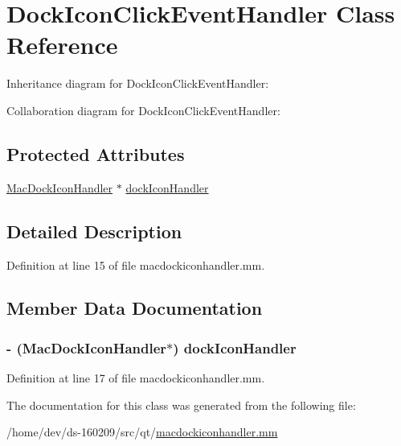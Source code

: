 \hypertarget{interface_dock_icon_click_event_handler}{}\section{Dock\+Icon\+Click\+Event\+Handler Class Reference}
\label{interface_dock_icon_click_event_handler}


Inheritance diagram for Dock\+Icon\+Click\+Event\+Handler\+:


Collaboration diagram for Dock\+Icon\+Click\+Event\+Handler\+:
\subsection*{Protected Attributes}
\begin{DoxyCompactItemize}
\item 
\hyperlink{class_mac_dock_icon_handler}{Mac\+Dock\+Icon\+Handler} $\ast$ \hyperlink{interface_dock_icon_click_event_handler_aa78888185bb434f259aac3deff007acb}{dock\+Icon\+Handler}
\end{DoxyCompactItemize}


\subsection{Detailed Description}


Definition at line 15 of file macdockiconhandler.\+mm.



\subsection{Member Data Documentation}
\hypertarget{interface_dock_icon_click_event_handler_aa78888185bb434f259aac3deff007acb}{}
\subsubsection[{dock\+Icon\+Handler}]{\setlength{\rightskip}{0pt plus 5cm}-\/ ({\bf Mac\+Dock\+Icon\+Handler}$\ast$) dock\+Icon\+Handler\hspace{0.3cm}{\ttfamily [protected]}}\label{interface_dock_icon_click_event_handler_aa78888185bb434f259aac3deff007acb}


Definition at line 17 of file macdockiconhandler.\+mm.



The documentation for this class was generated from the following file\+:\begin{DoxyCompactItemize}
\item 
/home/dev/ds-\/160209/src/qt/\hyperlink{macdockiconhandler_8mm}{macdockiconhandler.\+mm}\end{DoxyCompactItemize}
